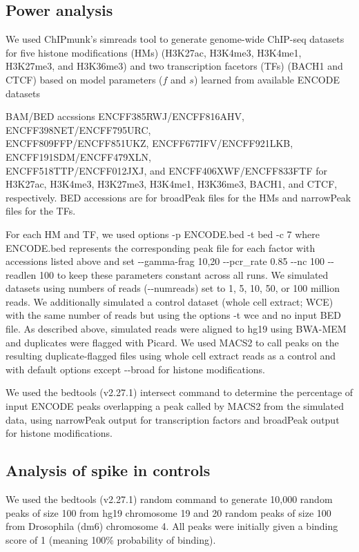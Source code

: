 \documentclass[12pt]{article}
\begin{document}
\subsection*{Power analysis}
We used ChIPmunk's simreads tool to generate genome-wide ChIP-seq datasets for five histone modifications (HMs) (H3K27ac, H3K4me3, H3K4me1, H3K27me3, and H3K36me3) and two transcription facetors (TFs) (BACH1 and CTCF) based on model parameters ($f$ and $s$) learned from available ENCODE datasets

BAM/BED accssions ENCFF385RWJ/ENCFF816AHV, ENCFF398NET/ENCFF795URC, \\ENCFF809FFP/ENCFF851UKZ, ENCFF677IFV/ENCFF921LKB, ENCFF191SDM/ENCFF479XLN,\\ ENCFF518TTP/ENCFF012JXJ, and ENCFF406XWF/ENCFF833FTF for
H3K27ac, H3K4me3, H3K27me3, H3K4me1, H3K36me3, BACH1, and CTCF, respectively. BED accessions are for broadPeak files for the HMs and narrowPeak files for the TFs.

For each HM and TF, we used options -p ENCODE.bed -t bed -c 7 where ENCODE.bed represents the corresponding peak file for each factor with accessions listed above and set -{}-gamma-frag 10,20 -{}-pcr\_rate 0.85 -{}-nc 100 -{}-readlen 100 to keep these parameters constant across all runs.
We simulated datasets using numbers of reads (-{}-numreads) set to 1, 5, 10, 50, or 100 million reads.
We additionally simulated a control dataset (whole cell extract; WCE) with the same number of reads but using the options -t wce and no input BED file. As described above, simulated reads were aligned to hg19 using BWA-MEM and duplicates were flagged with Picard.
We used MACS2 \cite{MACS2} to call peaks on the resulting duplicate-flagged files using whole cell extract reads as a control and with default options except -{}-broad for histone modifications.

We used the bedtools \cite{bedtools} (v2.27.1) intersect command to determine the percentage of input ENCODE peaks overlapping a peak called by MACS2 from the simulated data, using narrowPeak output for transcription factors and broadPeak output for histone modifications.

\subsection*{Analysis of spike in controls}
We used the bedtools \cite{bedtools} (v2.27.1) random command to generate 10,000 random peaks of size 100 from hg19 chromosome 19 and 20 random peaks of size 100 from Drosophila (dm6) chromosome 4. All peaks were initially given a binding score of 1 (meaning 100\% probability of binding).
\end{document}
